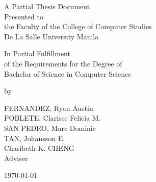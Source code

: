 %
%
%                 

\begin{titlepage}
\centering



\vspace{1.75cm}
A Partial Thesis Document\\
Presented to\\
the Faculty of the College of Computer Studies\\
De La Salle University Manila

\vspace{1.75cm}
In Partial Fulfillment\\
of the Requirements for the Degree of\\
Bachelor of  Science in Computer Science

\vspace{1.75cm}
by\\
\vspace{1cm}

FERNANDEZ, Ryan Austin \\
POBLETE, Clarisse Felicia M.  \\
SAN PEDRO, Marc Dominic  \\
TAN, Johansson E.  \\

\vspace{1.75cm}
Charibeth K. CHENG \\
Adviser

\vspace{1.75cm}
\today
\end{titlepage}
